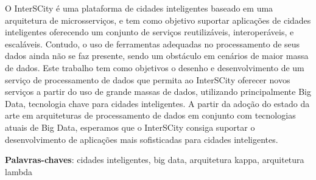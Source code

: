 \begin{resumo}

    O InterSCity é uma plataforma de cidades inteligentes baseado em uma
    arquitetura de microsserviços, e tem como objetivo suportar aplicações de %
    cidades inteligentes oferecendo um conjunto de serviços reutilizáveis,
    interoperáveis, e escaláveis. Contudo, o uso de ferramentas adequadas no
    processamento de seus dados ainda não se faz presente, sendo um obstáculo
    em cenários de maior massa de dados. Este trabalho tem como objetivos o
    desenho e desenvolvimento de um serviço de processamento de dados que
    permita ao InterSCity oferecer novos serviços a partir do uso de grande
    massas de dados, utilizando principalmente Big Data, tecnologia chave para
    cidades inteligentes. A partir da adoção do estado da arte em arquiteturas
    de processamento de dados em conjunto com tecnologias atuais de Big Data,
    esperamos que o InterSCity consiga suportar o desenvolvimento de aplicações
    mais sofisticadas para cidades inteligentes.

 \vspace{\onelineskip}
 \noindent
 \textbf{Palavras-chaves}: cidades inteligentes, big data, arquitetura kappa, arquitetura lambda
\end{resumo}
